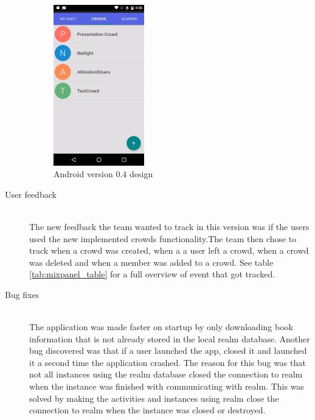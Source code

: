 \begin{description}
\begin{figure}
\centering
\includegraphics[height=7cm]{figs/v04/AndroidDesign-04.png}
\caption{Android version 0.4 design}
\label{fig:AndroidDesign-04}
\end{figure}

    \item[User feedback] \hfill\\
The new feedback the team wanted to track in this version was if the users used the new implemented crowds functionality.The team then chose to track when a crowd was created, when a a user left a crowd, when a crowd was deleted and when a member was added to a crowd. See table \ref{tab:mixpanel_table} for a full overview of event that got tracked.

    \item[Bug fixes] \hfill\\
The application was made faster on startup by only downloading book information that is not already stored in the local realm database. Another bug discovered was that if a user launched the app, closed it and launched it a second time the application crashed. The reason for this bug was that not all instances using the realm database closed the connection to realm when the instance was finished with communicating with realm. This was solved by making the activities and instances using realm close the connection to realm when the instance was closed or destroyed.
\end{description}

